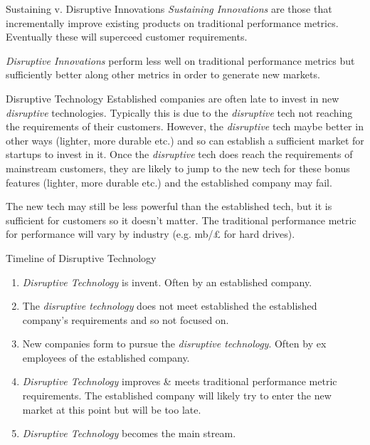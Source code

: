 \documentclass[11pt,a4paper]{article}
\begin{document}
\begin{remark}{Sustaining v. Disruptive Innovations}
  \textit{Sustaining Innovations} are those that incrementally improve existing products on traditional performance metrics. Eventually these will superceed customer requirements.
  \par \textit{Disruptive Innovations} perform less well on traditional performance metrics but sufficiently better along other metrics in order to generate new markets.
\end{remark}

\begin{proposition}{Disruptive Technology}
  Established companies are often late to invest in new \textit{disruptive} technologies. Typically this is due to the \textit{disruptive} tech not reaching the requirements of their customers. However, the \textit{disruptive} tech maybe better in other ways (lighter, more durable etc.) and so can establish a sufficient market for startups to invest in it. Once the \textit{disruptive} tech does reach the requirements of mainstream customers, they are likely to jump to the new tech for these bonus features (lighter, more durable etc.) and the established company may fail.
  \par The new tech may still be less powerful than the established tech, but it is sufficient for customers so it doesn't matter. The traditional performance metric for performance will vary by industry (e.g. mb/£ for hard drives).
\end{proposition}

\begin{proposition}{Timeline of Disruptive Technology}
  \begin{enumerate}
    \item \textit{Disruptive Technology} is invent. Often by an established company.
    \item The \textit{disruptive technology} does not meet established the established company's requirements and so not focused on.
    \item New companies form to pursue the \textit{disruptive technology}. Often by ex employees of the established company.
    \item \textit{Disruptive Technology} improves \& meets traditional performance metric requirements. The established company will likely try to enter the new market at this point but will be too late.
    \item \textit{Disruptive Technology} becomes the main stream.
  \end{enumerate}
\end{proposition}
\end{document}
